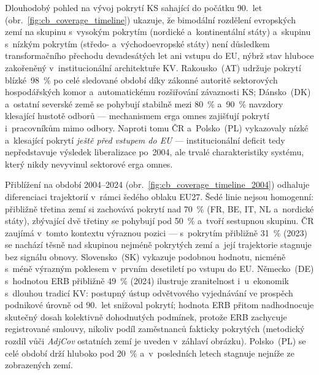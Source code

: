 
Dlouhodobý pohled na vývoj pokrytí \ac{KS} sahající do počátku 90.~let
(obr.~\ref{fig:cb_coverage_timeline}) ukazuje, že bimodální rozdělení
evropských zemí na skupinu s~vysokým pokrytím (nordické a~kontinentální
státy) a~skupinu s~nízkým pokrytím (středo- a~východoevropské státy) není
důsledkem transformačního přechodu devadesátých let ani vstupu do \ac{EU},
nýbrž stav hluboce zakořeněný v~institucionální architektuře \ac{KV}.
Rakousko~(AT) udržuje pokrytí blízké~\SI{98}{\percent} po celé sledované
období díky zákonné autoritě sektorových hospodářských komor a~automatickému
rozšiřování závaznosti \ac{KS}; Dánsko~(DK) a~ostatní severské země se
pohybují stabilně mezi \SI{80}{\percent} a~\SI{90}{\percent} navzdory klesající
hustotě odborů --- mechanismem erga omnes zajišťují pokrytí i~pracovníkům
mimo odbory.
Naproti tomu ČR a~Polsko~(PL) vykazovaly nízké a~klesající pokrytí
\emph{ještě před vstupem do \ac{EU}} --- institucionální deficit tedy
nepředstavuje výsledek liberalizace po~2004, ale trvalé charakteristiky
systému, který nikdy nevyvinul sektorové erga omnes.



Přiblížení na období 2004--2024 (obr.~\ref{fig:cb_coverage_timeline_2004})
odhaluje diferenciaci trajektorií v~rámci šedého oblaku \ac{EU}27.
Šedé linie nejsou homogenní: přibližně třetina zemí si zachovává pokrytí
nad \SI{70}{\percent} (FR, BE, IT, NL a~nordické státy), zbývající dvě třetiny
se pohybují pod \SI{50}{\percent} a~tvoří sestupnou skupinu.
ČR zaujímá v~tomto kontextu výraznou pozici --- s~pokrytím přibližně
\SI{31}{\percent} (2023) se nachází těsně nad skupinou nejméně pokrytých zemí
a~její trajektorie stagnuje bez signálu obnovy.
Slovensko~(SK) vykazuje podobnou hodnotu, nicméně s~méně výrazným poklesem
v~prvním desetiletí po vstupu do \ac{EU}.
Německo~(DE) s~hodnotou ERB přibližně \SI{49}{\percent} (2024) ilustruje
zranitelnost i~u~ekonomik s~dlouhou tradicí \ac{KV}: postupný ústup
odvětvového vyjednávání ve prospěch podnikové úrovně od 90.~let snižoval
pokrytí; hodnota ERB přitom nadhodnocuje skutečný dosah kolektivně dohodnutých
podmínek, protože ERB zachycuje registrované smlouvy, nikoliv podíl
zaměstnanců fakticky pokrytých (metodický rozdíl vůči \textit{AdjCov} ostatních
zemí je uveden v~záhlaví obrázku).
Polsko~(PL) se celé období drží hluboko pod \SI{20}{\percent} a~v~posledních
letech stagnuje nejníže ze zobrazených zemí.

